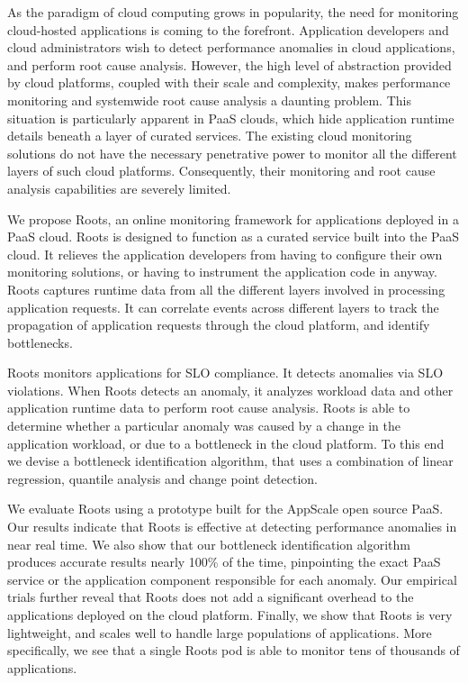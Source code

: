 As the paradigm of cloud computing grows in popularity, the need for monitoring cloud-hosted 
applications is coming to the forefront. Application developers and cloud administrators
wish to detect performance anomalies in cloud applications, and
perform root cause analysis. However, the high level of abstraction provided by cloud
platforms, coupled with their scale and complexity, makes performance monitoring and
systemwide root cause analysis a daunting problem. This situation is particularly apparent in
PaaS clouds, which hide application runtime details beneath a layer of curated services.
The existing cloud monitoring solutions do not have the necessary penetrative power
to monitor all the different layers of such cloud platforms. Consequently, their monitoring
and root cause analysis capabilities are severely limited.

We propose Roots, an online monitoring framework for applications deployed in a PaaS cloud. 
Roots is designed to function as a curated service
built into the PaaS cloud. It relieves the application developers from having to configure
their own monitoring solutions, or having to instrument the application code in anyway.
Roots captures runtime data from all the different layers involved
in processing application requests. It can correlate events across different layers
to track the propagation of application requests through the cloud platform, and
identify bottlenecks.

Roots monitors applications for SLO compliance. It detects anomalies via SLO violations.
When Roots detects an anomaly, 
it analyzes workload data and other application runtime data
to perform root cause analysis. Roots is able to determine whether a particular
anomaly was caused by a change in the application workload, or due to a bottleneck
in the cloud platform. To this end we devise a bottleneck identification algorithm, that
uses a combination of linear regression, quantile analysis and change point detection.

We evaluate Roots using a prototype built for the AppScale open source PaaS. 
Our results indicate that Roots is effective at detecting performance anomalies
in near real time. We also show that our bottleneck identification algorithm
produces accurate results nearly 100\% of the time, pinpointing the exact PaaS
service or the application component responsible for each anomaly. Our empirical trials further 
reveal that Roots does not add a significant overhead to the applications deployed
on the cloud platform. Finally, we show that Roots is very lightweight, 
and scales well to handle large populations of applications. More specifically,
we see that a single Roots pod is able to monitor tens of thousands of applications.